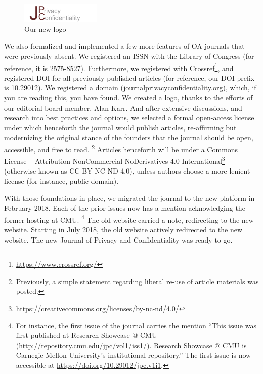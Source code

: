 \documentclass[final]{jpcfinal} %
\newcommand{\urlcite}[2]{#2\footnote{\url{#1}}}
\begin{document}
\begin{figure}
	\begin{cornerbox}[width=2in]
		\includegraphics[width=1.5in]{tmpl-images/JPC_4.jpg}
		\caption{Our new logo}
		
	\end{cornerbox}
\end{figure}
We also formalized and implemented a few more features of OA journals that were previously absent. We registered an \ac{ISSN} with the Library of Congress (for reference, it is 2575-8527). Furthermore, we registered with \urlcite{https://www.crossref.org/}{Crossref}, and registered \ac{DOI} for all previously published articles (for reference, our \ac{DOI} prefix is 10.29012).  We registered a domain (\href{https://www.journalprivacyconfidentiality.org}{journalprivacyconfidentiality.org}), which, if you are reading this, you have found. We created a logo, thanks to the efforts of our editorial board member, Alan Karr. And after extensive discussions, and research into best practices and options, we selected a formal open-access license under which henceforth the journal would publish articles, re-affirming but modernizing the original stance of the founders that the journal should be open, accessible, and free to read.%
\footnote{Previously, a simple statement regarding liberal re-use of article materials was posted.}
Articles henceforth will be under a  \urlcite{https://creativecommons.org/licenses/by-nc-nd/4.0/}{Commons License – Attribution-NonCommercial-NoDerivatives 4.0 International} (otherwise known as CC BY-NC-ND 4.0), unless authors choose a more lenient license (for instance, public domain). 



With those foundations in place, we migrated the journal to the new platform in February 2018. 
Each of the prior issues now has a mention acknowledging the former hosting at CMU.%
\footnote{
	For instance, the first issue of the journal carries the mention ``This issue was first published at Research Showcase @ CMU (\url{http://repository.cmu.edu/jpc/vol1/iss1/}). Research Showcase @ CMU is Carnegie Mellon University's institutional repository.'' The first issue is now accessible at \url{https://doi.org/10.29012/jpc.v1i1}.}
The old website  carried a note, redirecting to the new website. Starting in July 2018, the old website actively redirected to the new website. The new Journal of Privacy and Confidentiality was ready to go.
\end{document}
